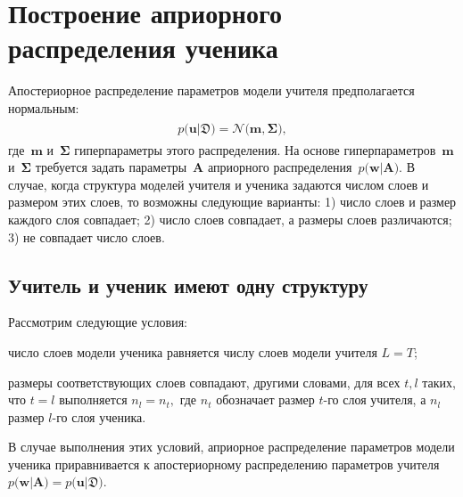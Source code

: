 \documentclass[12pt]{a&t}
\begin{document}
\section{Построение априорного распределения ученика}
Апостериорное распределение параметров модели учителя предполагается нормальным:
\begin{gather}
\label{eq:ap:1}
\begin{aligned}
p\bigr(\mathbf{u}|\mathfrak{D}\bigr) = \mathcal{N}\bigr(\mathbf{m}, \bm{\Sigma}\bigr),
\end{aligned}
\end{gather}
где~$\mathbf{m}$ и~$\bm{\Sigma}$ гиперпараметры этого распределения. На основе гиперпараметров~$\mathbf{m}$ и~$\bm{\Sigma}$ требуется задать параметры~$\mathbf{A}$ априорного распределения~$p\bigr(\mathbf{w}|\mathbf{A}\bigr).$
В случае, когда структура моделей учителя и ученика задаются числом слоев и размером этих слоев, то возможны следующие варианты: 1) число слоев и размер каждого слоя совпадает; 2) число слоев совпадает, а размеры слоев различаются; 3) не совпадает число слоев.

\subsection{Учитель и ученик имеют одну структуру}
\label{section:one:space}
Рассмотрим следующие условия:
\begin{enumlist}
    \item число слоев модели ученика равняется числу слоев модели учителя $L=T$;
    \item размеры соответствующих слоев совпадают, другими словами, для всех $t, l$ таких, что $t=l$ выполняется $n_l = n_t,$ где $n_t$ обозначает размер $t$-го слоя учителя, а $n_l$ размер $l$-го слоя ученика.
\end{enumlist}
В случае выполнения этих условий, априорное распределение параметров модели ученика приравнивается к апостериорному распределению параметров учителя $p\bigr(\mathbf{w}|\mathbf{A}\bigr) = p\bigr(\mathbf{u}|\mathfrak{D}\bigr)$.
\end{document}

